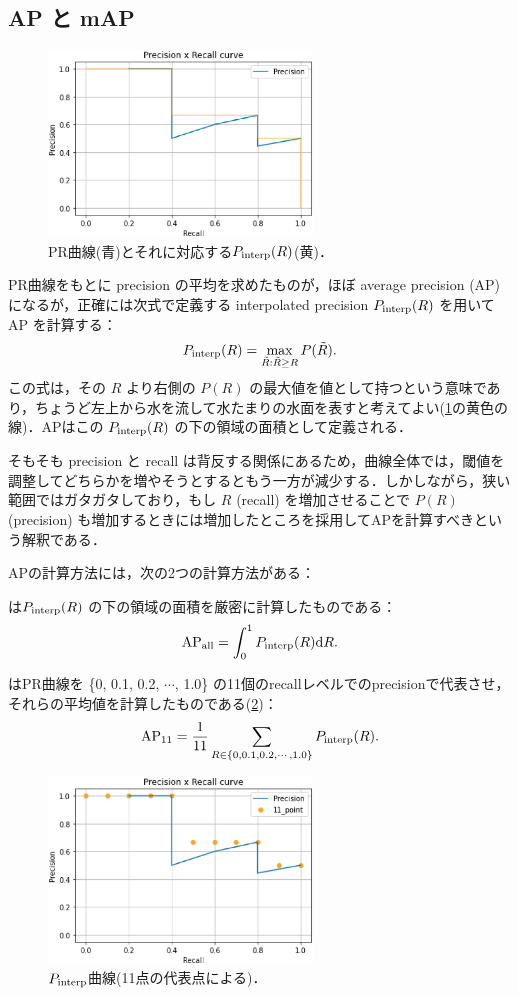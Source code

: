 \documentclass[originalpaper,fleqn]{jsaiart}     %
\begin{document}
\subsection{AP と mAP}
\begin{figure}
    \centering
    \includegraphics[width=7cm,clip]{fig/PR_interp.eps}
    \caption{ PR曲線(青)とそれに対応する$P_{\rm interp}(R)$(黄)．}
    \label{fig:PRinterp}
\end{figure}
PR曲線をもとに precision の平均を求めたものが，ほぼ average precision (AP) になるが，正確には次式で定義する  interpolated precision $P_{\rm interp}(R)$ を用いて AP を計算する：
$$ P_{\rm interp}(R) = \max_{\tilde{R}:\tilde{R}{\geq}R} P(\tilde{R}). $$
この式は，その $R$ より右側の $P(R)$ の最大値を値として持つという意味であり，ちょうど左上から水を流して水たまりの水面を表すと考えてよい(\ref{fig:PRinterp}の黄色の線)．APはこの $P_{\rm interp}(R)$ の下の領域の面積として定義される．

そもそも precision と recall は背反する関係にあるため，曲線全体では，閾値を調整してどちらかを増やそうとするともう一方が減少する．しかしながら，狭い範囲ではガタガタしており，もし $R$ (recall) を増加させることで $P(R)$ (precision) も増加するときには増加したところを採用してAPを計算すべきという解釈である\cite{MRS09}．

APの計算方法には，次の2つの計算方法がある：

は$P_{\rm interp}(R)$ の下の領域の面積を厳密に計算したものである：
$$ \mbox{AP}_{\rm all} = \int_0^1 P_{\rm interp}(R) {\rm d}R. $$

はPR曲線を \{0, 0.1, 0.2, $\cdots$, 1.0\} の11個のrecallレベルでのprecisionで代表させ，それらの平均値を計算したものである(\ref{fig:PR11})：
$$ \mbox{AP}_{11} = \frac{1}{11} \sum_{R\in\{0, 0.1, 0.2, \cdots, 1.0\}} P_{\rm interp}(R). $$
\begin{figure}
    \centering
    \includegraphics[width=7cm,clip]{fig/PR_11.eps}
    \caption{ $P_{\rm interp}$曲線(11点の代表点による)．}
    \label{fig:PR11}
\end{figure}
\end{document}
